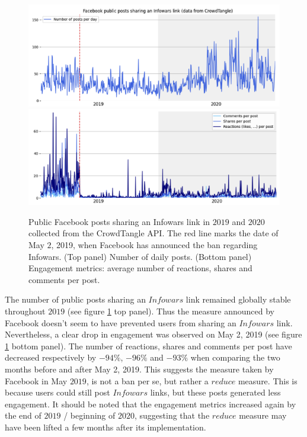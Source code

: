 \documentclass{article}
\begin{document}
\begin{figure}[h]
	\centering
	
		\includegraphics[scale=0.3]{./img/infowars/fb_infowars_1.png}
		\includegraphics[scale=0.3]{./img/infowars/fb_infowars_2.png} 
	
	\caption{Public Facebook posts sharing an Infowars link in $2019$ and $2020$ collected from the CrowdTangle API. The red line marks the date of May $2$, 2019, when Facebook has announced the ban regarding Infowars. (Top panel) Number of daily posts. (Bottom panel) Engagement metrics: average number of reactions, shares and comments per post. }
	\label{infowars1}
\end{figure}

The number of public posts sharing an $Infowars$ link remained globally stable throughout $2019$ (see figure \ref{infowars1} top panel). Thus the measure announced by Facebook doesn't seem to have prevented users from sharing an $Infowars$ link. Nevertheless, a clear drop in engagement was observed on May 2, 2019 (see figure \ref{infowars1} bottom panel). The number of reactions, shares and comments per post have decreased respectively  by $-94\%$,  $-96\%$ and $-93\%$  when comparing the two months before and after May 2, 2019. This suggests the measure taken by Facebook in May $2019$, is not a ban per se, but rather a $reduce$ measure. This is because users could still post $Infowars$ links, but these posts generated less engagement. It should be noted that the engagement metrics increased again by the end of $2019$ / beginning of $2020$, suggesting that the $reduce$ measure may have been lifted a few months after its implementation.
\end{document}
